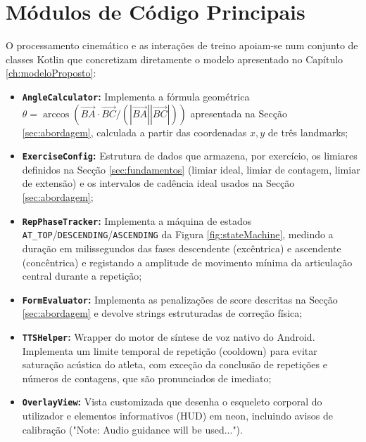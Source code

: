 \section{Módulos de Código Principais}
\label{sec:modulosCodigo}

O processamento cinemático e as interações de treino apoiam-se num conjunto de classes Kotlin que concretizam diretamente o modelo apresentado no Capítulo \ref{ch:modeloProposto}:
\begin{itemize}
    \item \textbf{\texttt{AngleCalculator}:} Implementa a fórmula geométrica $\theta = \arccos\left(\vec{BA} \cdot \vec{BC} / (|\vec{BA}||\vec{BC}|)\right)$ apresentada na Secção \ref{sec:abordagem}, calculada a partir das coordenadas $x,y$ de três landmarks;
    \item \textbf{\texttt{ExerciseConfig}:} Estrutura de dados que armazena, por exercício, os limiares definidos na Secção \ref{sec:fundamentos} (limiar ideal, limiar de contagem, limiar de extensão) e os intervalos de cadência ideal usados na Secção \ref{sec:abordagem};
    \item \textbf{\texttt{RepPhaseTracker}:} Implementa a máquina de estados \texttt{AT\_TOP}/\texttt{DESCENDING}/\texttt{ASCENDING} da Figura \ref{fig:stateMachine}, medindo a duração em milissegundos das fases descendente (excêntrica) e ascendente (concêntrica) e registando a amplitude de movimento mínima da articulação central durante a repetição;
    \item \textbf{\texttt{FormEvaluator}:} Implementa as penalizações de score descritas na Secção \ref{sec:abordagem} e devolve strings estruturadas de correção física;
    \item \textbf{\texttt{TTSHelper}:} Wrapper do motor de síntese de voz nativo do Android. Implementa um limite temporal de repetição (cooldown) para evitar saturação acústica do atleta, com exceção da conclusão de repetições e números de contagens, que são pronunciados de imediato;
    \item \textbf{\texttt{OverlayView}:} Vista customizada que desenha o esqueleto corporal do utilizador e elementos informativos (HUD) em neon, incluindo avisos de calibração ("Note: Audio guidance will be used...").
\end{itemize}

